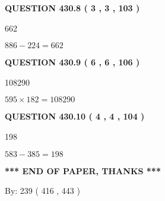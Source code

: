 \documentclass{ctexart}
\begin{document}
 
 
 
  
\vspace{0.2in}
  
{\textbf{\Large{QUESTION
430.8 
 ( 3 , 3 , 103 )
}}}
  
  
 
 
\noindent{}

662
 
 
 
 
\noindent{}

$ %
886 -  %
224=   %
662$
 
 
  
\vspace{0.2in}
  
{\textbf{\Large{QUESTION
430.9 
 ( 6 , 6 , 106 )
}}}
  
  
 
 
\noindent{}

108290
 
 
 
 
\noindent{}

$ %
595 \times  %
182=   %
108290$
 
 
  
\vspace{0.2in}
  
{\textbf{\Large{QUESTION
430.10 
 ( 4 , 4 , 104 )
}}}
  
  
 
 
\noindent{}

198
 
 
 
 
\noindent{}

$ %
583 -  %
385=   %
198$
 
 
   
   
 \vspace{0.2in}
 
   
   
   
   
\vspace{1.0in} 
{\textbf{\large{ *** END OF PAPER, THANKS *** }}} 
   
   
\hspace{1.0in} By: 
 239 ( 416 ,  443 )
   
\end{document}
